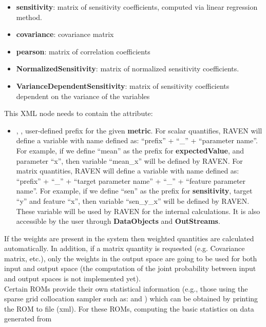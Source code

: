 \begin{itemize}
\begin{itemize}
    \item \textbf{sensitivity}: matrix of sensitivity coefficients, computed via linear regression method.
    \item \textbf{covariance}: covariance matrix
    \item \textbf{pearson}: matrix of correlation coefficients
    \item \textbf{NormalizedSensitivity}: matrix of normalized sensitivity
    coefficients. 
    \item \textbf{VarianceDependentSensitivity}: matrix of sensitivity coefficients dependent on the variance of the variables
  \end{itemize}
  This XML node needs to contain the attribute:
  \begin{itemize}
    \itemsep0em
    \item {}, , user-defined prefix for the given \textbf{metric}.
      For scalar quantifies, RAVEN will define a variable with name defined as:  ``prefix'' + ``\_'' + ``parameter name''.
      For example, if we define ``mean'' as the prefix for \textbf{expectedValue}, and parameter ``x'', then variable
      ``mean\_x'' will be defined by RAVEN.
      For matrix quantities, RAVEN will define a variable with name defined as: ``prefix'' + ``\_'' + ``target parameter name'' + ``\_'' + ``feature parameter name''.
      For example, if we define ``sen'' as the prefix for \textbf{sensitivity}, target ``y'' and feature ``x'', then
      variable ``sen\_y\_x'' will be defined by RAVEN.
      \nb These variable will be used by RAVEN for the internal calculations. It is also accessible by the user through
      \textbf{DataObjects} and \textbf{OutStreams}. 
  \end{itemize}
  \nb If the weights are present in the system then weighted quantities are calculated automatically. In addition, if a matrix quantity is requested (e.g. Covariance matrix, etc.), only the weights in the output space are going to be used for both input and output space (the computation of the joint probability between input and output spaces is not implemented yet).
  \\
  \nb Certain ROMs provide their own statistical information (e.g., those using
  the sparse grid collocation sampler such as: 
  and ) which can be obtained by printing the ROM to file
  (xml). For these ROMs, computing the basic statistics on data generated from

\end{itemize}
